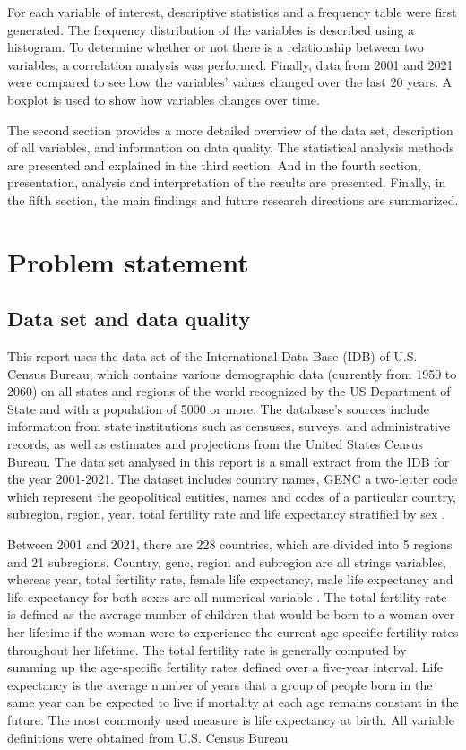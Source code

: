 \documentclass[12 pt]{scrartcl}
\begin{document}
For each variable of interest, descriptive statistics and a frequency table were first generated. The frequency distribution of the variables is described using a histogram. To determine whether or not there is a relationship between two variables, a correlation analysis was performed. Finally, data from 2001 and 2021 were compared to see how the variables' values changed over the last 20 years. A boxplot is used to show how variables changes over time.

The second section provides a more detailed overview of the data set, description of all variables, and information on data quality. The statistical analysis methods are presented and explained in the third section. And in the fourth section, presentation, analysis and interpretation of the results are presented. Finally, in the fifth section, the main findings and future research directions are summarized.


\section{Problem statement}

\subsection{Data set and data quality}

This report uses the data set of the International Data Base (IDB) of U.S. Census Bureau, which contains various demographic data (currently from 1950 to 2060) on all states and regions of the world recognized by the US Department of State and with a population of 5000 or more. The database's sources include information from state institutions such as censuses, surveys, and administrative records, as well as estimates and projections from the United States Census Bureau. The data set analysed in this report is a small extract from the IDB for the year 2001-2021. The dataset includes country names, GENC a two-letter code which represent the geopolitical entities, names and codes of a particular country, subregion, region, year, total fertility rate and life expectancy stratified by sex \citep{IDB}. 

Between 2001 and 2021, there are 228 countries, which are divided into 5 regions and 21 subregions. Country, genc, region and subregion are all strings variables, whereas year, total fertility rate, female life expectancy, male life expectancy and life expectancy for both sexes are all numerical variable \citep{IDB}.  The total fertility rate is defined as the average number of children that would be born to a woman over her lifetime if the woman were to experience the current age-specific fertility rates throughout her lifetime. The total fertility rate is generally computed by summing up the age-specific fertility rates defined over a five-year interval. Life expectancy is the average number of years that a group of people born in the same year can be expected to live if mortality at each age remains constant in the future. The most commonly used measure is life expectancy at birth. All variable definitions were obtained from U.S. Census Bureau \citep{Glossary}
\end{document}
